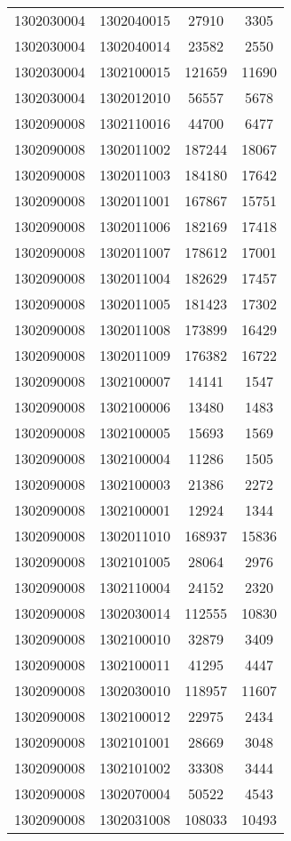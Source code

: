 \begin{longtable}{llcc}
1302030004 & 1302040015 & 27910 & 3305\\
1302030004 & 1302040014 & 23582 & 2550\\
1302030004 & 1302100015 & 121659 & 11690\\
1302030004 & 1302012010 & 56557 & 5678\\
1302090008 & 1302110016 & 44700 & 6477\\
1302090008 & 1302011002 & 187244 & 18067\\
1302090008 & 1302011003 & 184180 & 17642\\
1302090008 & 1302011001 & 167867 & 15751\\
1302090008 & 1302011006 & 182169 & 17418\\
1302090008 & 1302011007 & 178612 & 17001\\
1302090008 & 1302011004 & 182629 & 17457\\
1302090008 & 1302011005 & 181423 & 17302\\
1302090008 & 1302011008 & 173899 & 16429\\
1302090008 & 1302011009 & 176382 & 16722\\
1302090008 & 1302100007 & 14141 & 1547\\
1302090008 & 1302100006 & 13480 & 1483\\
1302090008 & 1302100005 & 15693 & 1569\\
1302090008 & 1302100004 & 11286 & 1505\\
1302090008 & 1302100003 & 21386 & 2272\\
1302090008 & 1302100001 & 12924 & 1344\\
1302090008 & 1302011010 & 168937 & 15836\\
1302090008 & 1302101005 & 28064 & 2976\\
1302090008 & 1302110004 & 24152 & 2320\\
1302090008 & 1302030014 & 112555 & 10830\\
1302090008 & 1302100010 & 32879 & 3409\\
1302090008 & 1302100011 & 41295 & 4447\\
1302090008 & 1302030010 & 118957 & 11607\\
1302090008 & 1302100012 & 22975 & 2434\\
1302090008 & 1302101001 & 28669 & 3048\\
1302090008 & 1302101002 & 33308 & 3444\\
1302090008 & 1302070004 & 50522 & 4543\\
1302090008 & 1302031008 & 108033 & 10493\\

\end{longtable}
